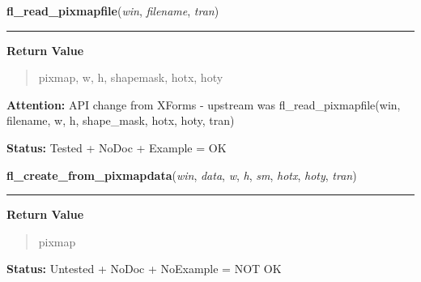 \hspace{.8\funcindent}\begin{boxedminipage}{\funcwidth}

    \raggedright \textbf{fl\_read\_pixmapfile}(\textit{win}, \textit{filename}, \textit{tran})

    \vspace{-1.5ex}

    \rule{\textwidth}{0.5\fboxrule}
\setlength{\parskip}{2ex}
\setlength{\parskip}{1ex}
      \textbf{Return Value}
    \vspace{-1ex}

      \begin{quote}
      pixmap, w, h, shapemask, hotx, hoty

      \end{quote}

\textbf{Attention:} API change from XForms - upstream was fl\_read\_pixmapfile(win, filename, 
w, h, shape\_mask, hotx, hoty, tran)



\textbf{Status:} Tested + NoDoc + Example = OK



    \end{boxedminipage}

    \label{xformslib:library:fl_create_from_pixmapdata}

    \vspace{0.5ex}

\hspace{.8\funcindent}\begin{boxedminipage}{\funcwidth}

    \raggedright \textbf{fl\_create\_from\_pixmapdata}(\textit{win}, \textit{data}, \textit{w}, \textit{h}, \textit{sm}, \textit{hotx}, \textit{hoty}, \textit{tran})

    \vspace{-1.5ex}

    \rule{\textwidth}{0.5\fboxrule}
\setlength{\parskip}{2ex}
\setlength{\parskip}{1ex}
      \textbf{Return Value}
    \vspace{-1ex}

      \begin{quote}
      pixmap

      \end{quote}

\textbf{Status:} Untested + NoDoc + NoExample = NOT OK



    \end{boxedminipage}

